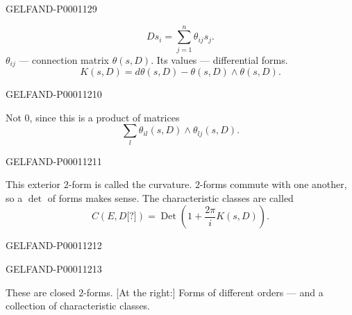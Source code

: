 \begin{GelfandAdjacentEvidence}{GELFAND-P000112}{9}

\begin{equation*}Ds_i=\sum_{j=1}^n\theta_{ij}s_j.\end{equation*}
$\theta_{ij}$ — connection matrix $\theta(s,D)$.
Its values — differential forms.
\begin{equation*}K(s,D)=d\theta(s,D)-\theta(s,D)\wedge\theta(s,D).\end{equation*}
\end{GelfandAdjacentEvidence}
\begin{GelfandAdjacentEvidence}{GELFAND-P000112}{10}

Not $0$, since this is a product of matrices
\begin{equation*}\sum_l\theta_{il}(s,D)\wedge\theta_{lj}(s,D).\end{equation*}
\end{GelfandAdjacentEvidence}
\begin{GelfandAdjacentEvidence}{GELFAND-P000112}{11}

This exterior $2$-form is called the curvature.
$2$-forms commute with one another, so a $\det$ of forms makes sense.
The characteristic classes are called
\begin{equation*}C(E,D\text{[?]})=\operatorname{Det}\left(1+\frac{2\pi}{i}K(s,D)\right).\end{equation*}
\end{GelfandAdjacentEvidence}
\begin{GelfandAdjacentEvidence}{GELFAND-P000112}{12}

\end{GelfandAdjacentEvidence}
\begin{GelfandAdjacentEvidence}{GELFAND-P000112}{13}

These are closed $2$-forms.
[At the right:] Forms of different orders — and a collection of characteristic classes.
\end{GelfandAdjacentEvidence}



